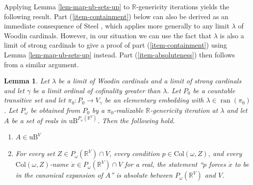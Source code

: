 \documentclass[fleqn, 11pt]{amsart}
\theoremstyle{plain}
\newtheorem{lem}[thm]{Lemma} \newtheorem*{lem*}{Lemma}
\theoremstyle{definition}
\newtheorem{defn}[thm]{Definition} \newtheorem*{defn*}{Definition}
\theoremstyle{remark}
\newcommand{\uB}{\mathrm{uB}}
\newcommand{\Col}{\mathrm{Col}}
\DeclareMathOperator{\ran}{ran}
\begin{document}
Applying Lemma \ref{lem-map-ub-sets-up} to $\mathbb{R}$-genericity iterations yields the following result.
Part (\ref{item-containment}) below can also be derived as an immediate consequence of
Steel \cite[Subclaim~1.1]{SteSTFree}, which applies more generally to any limit $\lambda$ of Woodin cardinals.  However, in our situation we can use the fact that $\lambda$ is also a limit of strong cardinals to give a proof of part (\ref{item-containment}) using Lemma \ref{lem-map-ub-sets-up} instead.  Part (\ref{item-absoluteness}) then follows from a similar argument.




\begin{lem}\label{lem-containment-and-absoluteness}
 Let  $\lambda$ be a limit of Woodin cardinals and a limit of strong cardinals and let $\gamma$ be a limit ordinal of cofinality greater than $\lambda$. 
Let $P_{0}$ be a countable transitive set and let $\pi_0 \colon P_0 \to V_{\gamma}$ be an elementary embedding with $\lambda \in \ran(\pi_0)$. 
Let $P_\omega$ be obtained from $P_0$ by a $\pi_0$-realizable $\mathbb{R}$-genericity iteration at $\lambda$ and let $A$ be a set of reals in $\uB^{P_\omega(\mathbb{R}^V)}$. Then the following hold. 
\begin{enumerate}
 \item \label{item-containment}
  $A \in \uB^V$
 \item \label{item-absoluteness}
  For every set $Z \in P_\omega(\mathbb{R}^V) \cap V$, every condition $p \in \Col(\omega,Z)$, and every $\Col(\omega,Z)$-name $\dot{x} \in P_\omega(\mathbb{R}^V) \cap V$ for a real, the statement ``$p$ forces $\dot{x}$ to be in the canonical expansion of $A$'' is absolute between $P_\omega(\mathbb{R}^V)$ and $V$.
\end{enumerate}
\end{lem}
\end{document}
